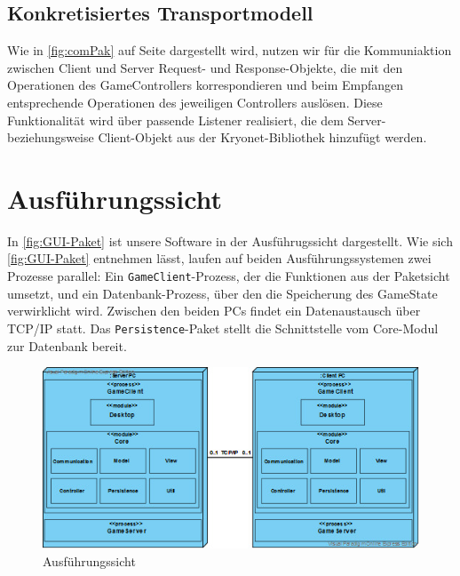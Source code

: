 \documentclass[enabledeprecatedfontcommands,fontsize=12pt,paper=a4,twoside,parskip=half]{scrartcl}
\begin{document}
\subsection{Konkretisiertes Transportmodell}
\label{subsec:datenmodell}

Wie in \autoref{fig:comPak} auf Seite \pageref{fig:comPak} dargestellt wird, nutzen wir für die Kommuniaktion zwischen Client und Server Request- und Response-Objekte, die mit den Operationen des GameControllers korrespondieren und beim Empfangen entsprechende Operationen des jeweiligen Controllers auslösen. Diese Funktionalität wird über passende Listener realisiert, die dem Server- beziehungsweise Client-Objekt aus der Kryonet-Bibliothek hinzufügt werden.


\clearpage

\section{Ausführungssicht}

\label{sec:ausfuehrung}

In \autoref{fig:GUI-Paket} ist unsere Software in der Ausführugssicht dargestellt. Wie sich \autoref{fig:GUI-Paket} entnehmen lässt, laufen auf beiden Ausführungssystemen zwei Prozesse parallel: Ein \texttt{GameClient}-Prozess, der die Funktionen aus der Paketsicht umsetzt, und ein Datenbank-Prozess, über den die Speicherung des GameState verwirklicht wird. Zwischen den beiden PCs findet ein Datenaustausch über TCP/IP statt. Das \texttt{Persistence}-Paket stellt die Schnittstelle vom Core-Modul zur Datenbank bereit.

\begin{figure}[H]
    \centering
    \includegraphics[width=\textwidth]{Bilder/ausfuehrungssicht.jpg}
    \caption{Ausführungssicht}
    \label{fig:GUI-Paket}
\end{figure}
\end{document}
